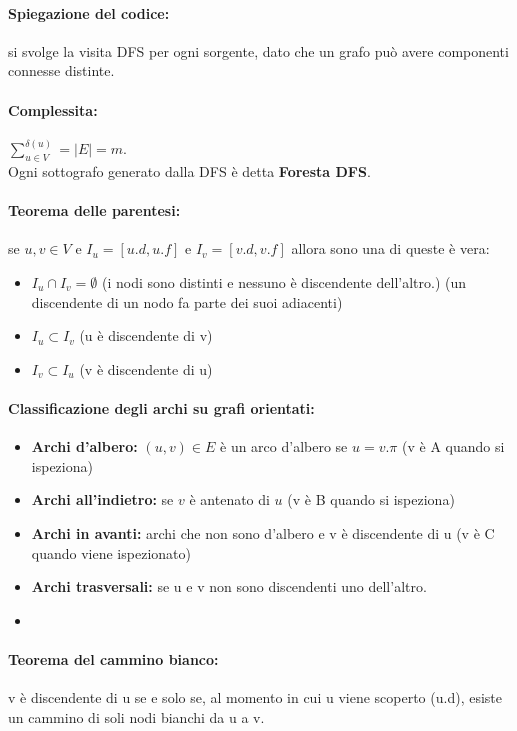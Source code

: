 \documentclass[a4paper,12pt]{article}
\begin{document}
\paragraph{Spiegazione del codice:} si svolge la visita DFS per ogni sorgente, dato che un grafo può avere componenti connesse distinte.
\paragraph{Complessita:} $\sum_{u \in V}^{\delta(u)} = |E| = m$.\\
Ogni sottografo generato dalla DFS è detta \textbf{Foresta DFS}.\\
\paragraph{Teorema delle parentesi:} se $u,v \in V$ e $I_u = [u.d,u.f]$ e $I_v = [v.d,v.f]$ allora sono una di queste è vera:
\begin{itemize}
    \item $I_u \cap I_v = \emptyset$ (i nodi sono distinti e nessuno è discendente dell'altro.) (un discendente di un nodo fa parte dei suoi adiacenti)
    \item $I_u \subset I_v$ (u è discendente di v)
    \item $I_v \subset I_u$ (v è discendente di u)
\end{itemize}
\paragraph{Classificazione degli archi su grafi orientati:}
\begin{itemize}
    \item \textbf{Archi d'albero:} $(u,v) \in E$ è un arco d'albero se $u = v.\pi$ (v è A quando si ispeziona)
    \item \textbf{Archi all'indietro:} se $v$ è antenato di $u$ (v è B quando si ispeziona)
    \item \textbf{Archi in avanti:} archi che non sono d'albero e v è discendente di u (v è C quando viene ispezionato)
    \item \textbf{Archi trasversali:} se u e v non sono discendenti uno dell'altro.
    \item 
\end{itemize}
\paragraph{Teorema del cammino bianco:} v è discendente di u se e solo se, al momento in cui u viene scoperto (u.d), esiste un cammino di soli nodi bianchi da u a v.\\
\end{document}

